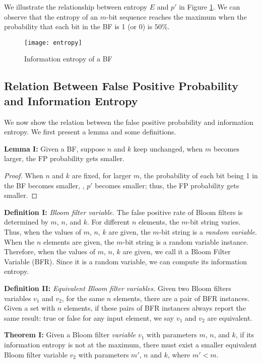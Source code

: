 We illustrate the relationship between entropy $E$ and $p'$ in Figure \ref{fig:entropy}. 
%
We can observe that the entropy of an $m$-bit sequence reaches the maximum when the probability that each bit in the BF is 1 (or 0) is $50\%$.

\begin{figure}[htbp]
\centering
\prefig
\texttt{[image: entropy]}
\postfig\precaption
\caption{Information entropy of a BF}
\postcaption
\label{fig:entropy}
\end{figure}

\presub \subsection{Relation Between False Positive Probability and Information Entropy} \postsub
%
We now show the relation between the false positive probability and information entropy. 
%
We first present a lemma and some definitions.

\noindent\textbf{Lemma I:} Given a BF, suppose $n$ and $k$ keep unchanged, when $m$ becomes larger, the FP probability gets smaller.

\begin{proof}
When $n$ and $k$ are fixed, for larger $m$, the probability of each bit being 1 in the BF becomes smaller, \ie, $p'$ becomes smaller; thus, the FP probability gets smaller.
\end{proof}

\noindent\textbf{Definition I:} \textit{Bloom filter variable.} The false positive rate of Bloom filters is determined by $m$, $n$, and $k$. For different $n$ elements, the $m$-bit string varies. Thus, when the values of $m$, $n$, $k$ are given, the $m$-bit string is a \textit{random variable}. When the $n$ elements are given, the $m$-bit string is a random variable instance. Therefore, when the values of $m$, $n$, $k$ are given, we call it a Bloom Filter Variable (BFR). Since it is a random variable, we can compute its information entropy.

\noindent\textbf{Definition II:} \textit{Equivalent Bloom filter variables.} Given two Bloom filters variables $v_1$ and $v_2$, for the same $n$ elements, there are a pair of BFR instances. Given a set with $n$ elements, if these pairs of BFR instances always report the same result: true or false for any input element, we say $v_1$ and $v_2$ are equivalent.

\noindent\textbf{Theorem I:} Given a Bloom filter \textit{variable} $v_1$ with parameters $m$, $n$, and $k$, if its information entropy is not at the maximum, there must exist a smaller equivalent Bloom filter variable $v_2$ with parameters $m'$, $n$ and $k$, where $m'<m$.

